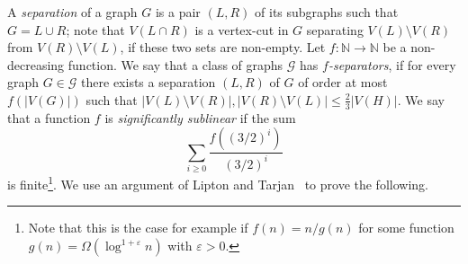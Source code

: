 \documentclass[12pt]{article}
\newcommand{\mc}[1]{\mathcal{#1}}
\begin{document}
A \emph{separation} of a graph $G$ is a pair $(L,R)$ of its subgraphs such that $G=L\cup R$;
note that $V(L\cap R)$ is a vertex-cut in $G$ separating $V(L)\setminus V(R)$ from $V(R)\setminus V(L)$,
if these two sets are non-empty.
Let $f:\mathbb{N}\to\mathbb{N}$ be a non-decreasing function.  We say that a class of graphs $\mc{G}$ has \emph{$f$-separators},
if for every graph $G \in \mc{G}$ there exists a separation $(L,R)$ of $G$ of order at most $f(|V(G)|)$ such that
$|V(L)\setminus V(R)|,|V(R)\setminus V(L)|\le \frac{2}{3}|V(H)|$.
We say that a function $f$ is \emph{significantly sublinear} if the sum $$\sum_{i\ge 0} \frac{f((3/2)^i)}{(3/2)^i}$$ is finite\footnote{Note that this is the case for example if $f(n)=n/g(n)$ for some function $g(n)=\Omega(\log^{1+\varepsilon} n)$ with $\varepsilon>0$.}.
We use an argument of Lipton and Tarjan~\cite{LipTar80} to prove the following.
\end{document}
